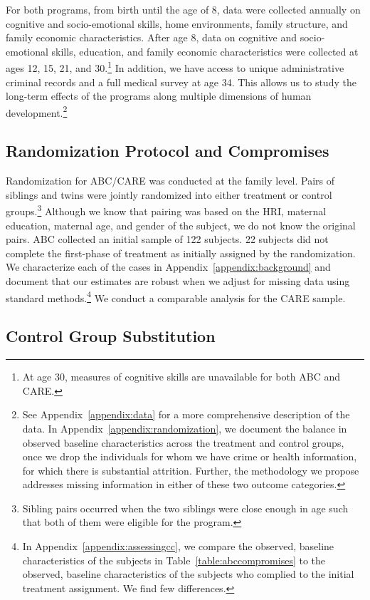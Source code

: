 For both programs, from birth until the age of 8, data were collected annually on cognitive and socio-emotional skills, home environments, family structure, and family economic characteristics. After age 8, data on cognitive and socio-emotional skills, education, and family economic characteristics were collected at ages 12, 15, 21, and 30.\footnote{At age 30, measures of cognitive skills are unavailable for both ABC and CARE.} In addition, we have access to unique administrative criminal records and a full medical survey at age 34. This allows us to study the long-term effects of the programs along multiple dimensions of human development.\footnote{See Appendix~\ref{appendix:data} for a more comprehensive description of the data. In Appendix~\ref{appendix:randomization}, we document the balance in observed baseline characteristics across the treatment and control groups, once we drop the individuals for whom we have crime or health information, for which there is substantial attrition. Further, the methodology we propose addresses missing information in either of these two outcome categories.}

\subsection{Randomization Protocol and Compromises} \label{section:randomization}

Randomization for ABC/CARE was conducted at the family level. Pairs of siblings and twins were jointly randomized into either treatment or control groups.\footnote{Sibling pairs occurred when the two siblings were close enough in age such that both of them were eligible for the program.} Although we know that pairing was based on the HRI, maternal education, maternal age, and gender of the subject, we do not know the original pairs. ABC collected an initial sample of 122 subjects. 22 subjects did not complete the first-phase of treatment as initially assigned by the randomization. We characterize each of the cases in Appendix~\ref{appendix:background} and document that our estimates are robust when we adjust for missing data using standard methods.\footnote{In Appendix~\ref{appendix:assessingcc}, we compare the observed, baseline characteristics of the subjects in Table~\ref{table:abccompromises} to the observed, baseline characteristics of the subjects who complied to the initial treatment assignment. We find few differences.} We conduct a comparable analysis for the CARE sample.

\subsection{Control Group Substitution}

